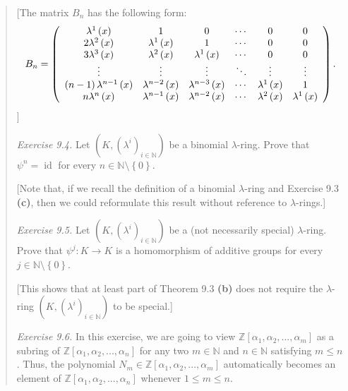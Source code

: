 \documentclass[numbers=enddot,12pt,final,onecolumn,notitlepage]{scrartcl}%
\begin{document}
\begin{quotation}
[The matrix $B_{n}$ has the following form:%
\[
B_{n}=\left(
\begin{array}
[c]{cccccc}%
\lambda^{1}\left(  x\right)  & 1 & 0 & \cdots & 0 & 0\\
2\lambda^{2}\left(  x\right)  & \lambda^{1}\left(  x\right)  & 1 & \cdots &
0 & 0\\
3\lambda^{3}\left(  x\right)  & \lambda^{2}\left(  x\right)  & \lambda
^{1}\left(  x\right)  & \cdots & 0 & 0\\
\vdots & \vdots & \vdots & \ddots & \vdots & \vdots\\
\left(  n-1\right)  \lambda^{n-1}\left(  x\right)  & \lambda^{n-2}\left(
x\right)  & \lambda^{n-3}\left(  x\right)  & \cdots & \lambda^{1}\left(
x\right)  & 1\\
n\lambda^{n}\left(  x\right)  & \lambda^{n-1}\left(  x\right)  & \lambda
^{n-2}\left(  x\right)  & \cdots & \lambda^{2}\left(  x\right)  & \lambda
^{1}\left(  x\right)
\end{array}
\right)  .
\]
]

\textit{Exercise 9.4.} Let $\left(  K,\left(  \lambda^{i}\right)
_{i\in\mathbb{N}}\right)  $ be a binomial $\lambda$-ring. Prove that $\psi
^{n}=\operatorname*{id}$ for every $n\in\mathbb{N}\setminus\left\{  0\right\}
$.

[Note that, if we recall the definition of a binomial $\lambda$-ring and
Exercise 9.3 \textbf{(c)}, then we could reformulate this result without
reference to $\lambda$-rings.]

\textit{Exercise 9.5.} Let $\left(  K,\left(  \lambda^{i}\right)
_{i\in\mathbb{N}}\right)  $ be a (not necessarily special) $\lambda$-ring.
Prove that $\psi^{j}:K\rightarrow K$ is a homomorphism of additive groups for
every $j\in\mathbb{N}\setminus\left\{  0\right\}  $.

[This shows that at least part of Theorem 9.3 \textbf{(b)} does not require
the $\lambda$-ring $\left(  K,\left(  \lambda^{i}\right)  _{i\in\mathbb{N}%
}\right)  $ to be special.]

\textit{Exercise 9.6.} In this exercise, we are going to view $\mathbb{Z}%
\left[  \alpha_{1},\alpha_{2},...,\alpha_{m}\right]  $ as a subring of
$\mathbb{Z}\left[  \alpha_{1},\alpha_{2},...,\alpha_{n}\right]  $ for any two
$m\in\mathbb{N}$ and $n\in\mathbb{N}$ satisfying $m\leq n$. Thus, the
polynomial $N_{m}\in\mathbb{Z}\left[  \alpha_{1},\alpha_{2},...,\alpha
_{m}\right]  $ automatically becomes an element of $\mathbb{Z}\left[
\alpha_{1},\alpha_{2},...,\alpha_{n}\right]  $ whenever $1\leq m\leq n$.


\end{quotation}
\end{document}
